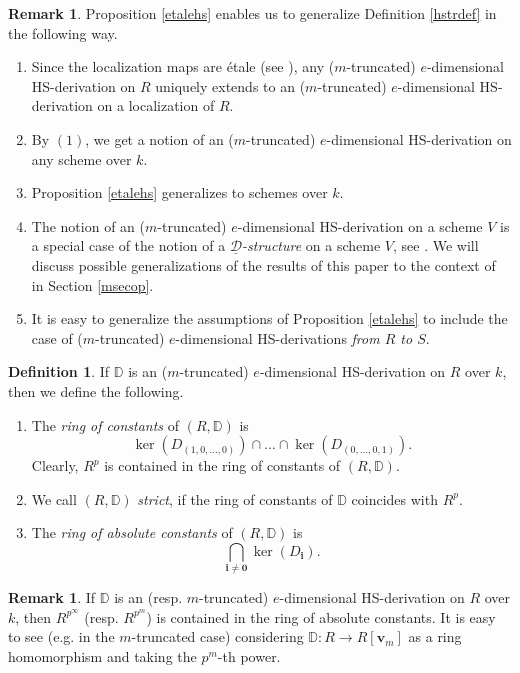 \documentclass[10pt]{amsart}
\theoremstyle{definition}
\newtheorem{definition}[theorem]{Definition}
\newtheorem{remark}[theorem]{Remark}
\begin{document}
\begin{remark}\label{defgen}
Proposition \ref{etalehs} enables us to generalize Definition \ref{hstrdef} in the following way.
\begin{enumerate}
\item Since the localization maps are \'{e}tale (see \cite[p. 193]{mat}), any ($m$-truncated) $e$-dimensional HS-derivation on $R$ uniquely extends to an ($m$-truncated) $e$-dimensional HS-derivation on a localization of $R$.

\item By $(1)$, we get a notion of an ($m$-truncated) $e$-dimensional HS-derivation on any scheme over $k$.

\item Proposition \ref{etalehs} generalizes to schemes over $k$.

\item The notion of an ($m$-truncated) $e$-dimensional HS-derivation on a scheme $V$ is a special case of the notion of a \emph{$\underline{\mathcal{D}}$-structure} on a scheme $V$, see \cite{MS}. We will discuss possible generalizations of the results of this paper to the context of \cite{MS} in Section \ref{msecop}.

\item It is easy to generalize the assumptions of Proposition \ref{etalehs} to include the case of ($m$-truncated) $e$-dimensional HS-derivations \emph{from $R$ to $S$}.
\end{enumerate}
\end{remark}
\begin{definition}\label{firstdefstrict}
If $\mathbb{D}$ is an ($m$-truncated) $e$-dimensional HS-derivation on $R$ over $k$, then we define the following.
\begin{enumerate}
\item The \emph{ring of constants} of $(R,\mathbb{D})$ is
$$\ker(D_{(1,0,\ldots,0)})\cap \ldots \cap \ker(D_{(0,\ldots,0,1)}).$$
Clearly, $R^p$ is contained in the ring of constants of $(R,\mathbb{D})$.

\item We call $(R,\mathbb{D})$ \emph{strict}, if the ring of constants of $\mathbb{D}$ coincides with $R^p$.

\item The \emph{ring of absolute constants} of $(R,\mathbb{D})$ is
$$\bigcap_{\mathbf{i}\neq \mathbf{0}}\ker(D_{\mathbf{i}}).$$
\end{enumerate}
\end{definition}
\begin{remark}
If $\mathbb{D}$ is an (resp. $m$-truncated) $e$-dimensional HS-derivation on $R$ over $k$, then $R^{p^{\infty}}$ (resp. $R^{p^m}$) is contained in the ring of absolute constants. It is easy to see (e.g. in the $m$-truncated case) considering $\mathbb{D}:R\to R[\mathbf{v}_m]$ as a ring homomorphism and taking the $p^m$-th power.
\end{remark}
\end{document}
